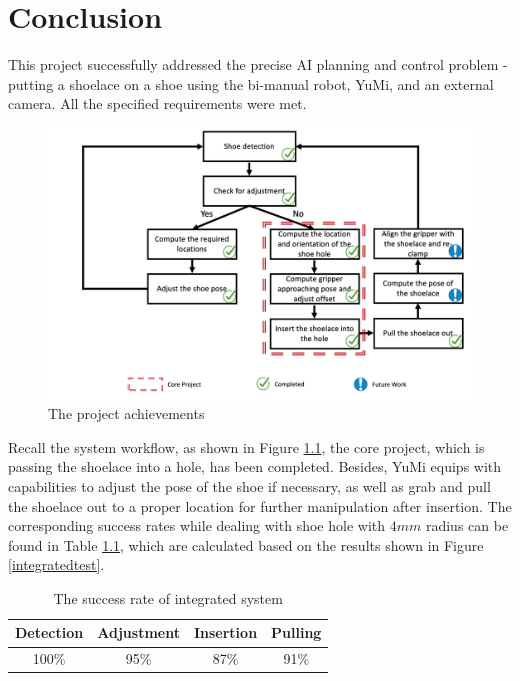 \chapter{Conclusion}

This project successfully addressed the precise AI planning and control problem - putting a shoelace on a shoe using the bi-manual robot, YuMi, and an external camera. All the specified requirements were met.

\begin{figure}[H]
\centering
\includegraphics[width = \columnwidth]{conclusion/workflowcon.png}
\caption{The project achievements}
\label{workflowcon}
\end{figure}

Recall the system workflow, as shown in Figure \ref{workflowcon}, the core project, which is passing the shoelace into a hole, has been completed. Besides, YuMi equips with capabilities to adjust the pose of the shoe if necessary, as well as grab and pull the shoelace out to a proper location for further manipulation after insertion. The corresponding success rates while dealing with shoe hole with $4mm$ radius can be found in Table \ref{sris}, which are calculated based on the results shown in Figure \ref{integratedtest}.

\begin{table}[H]
\centering
\begin{tabular}{||c|c|c|c||}
\hline
Detection & Adjustment & Insertion & Pulling \\ \hline\hline
100\% & 95\% & 87\% & 91\% \\ \hline
\end{tabular}
\caption{The success rate of integrated system}
\label{sris}
\end{table}

